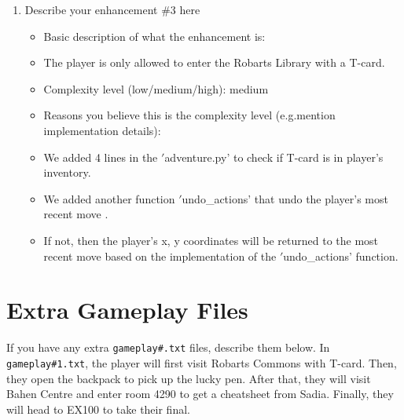 \documentclass[11pt]{article}
\begin{document}
\begin{enumerate}
\item Describe your enhancement \#3 here
	\begin{itemize}
	\item Basic description of what the enhancement is:
        \item The player is only allowed to enter the Robarts Library with a T-card.
	\item Complexity level (low/medium/high): medium
	\item Reasons you believe this is the complexity level (e.g.mention implementation details):
        \item We added 4 lines in the \('\)adventure.py' to check if T-card is in player's inventory.
        \item We added another function \('\)undo\_actions' that undo the player's most recent move .
        \item If not, then the player's x, y coordinates will be returned to the most recent move based on the implementation of the \('\)undo\_actions' function.
	\end{itemize}

\end{enumerate}


\section*{Extra Gameplay Files}

If you have any extra \texttt{gameplay\#.txt} files, describe them below.
    In \texttt{gameplay\#1.txt}, the player will first visit Robarts Commons with T-card. 
    Then, they open the backpack to pick up the lucky pen. 
    After that, they will visit Bahen Centre and enter room 4290 to get a cheatsheet from Sadia.
    Finally, they will head to EX100 to take their final.
\end{document}
